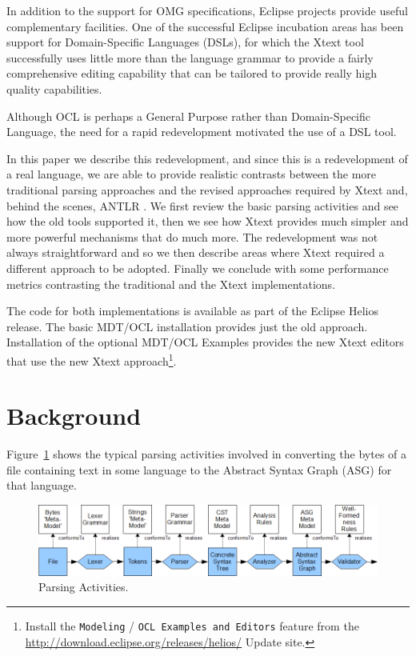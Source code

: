 \documentclass[runningheads,a4paper]{llncs}
\begin{document}
In addition to the support for OMG specifications, Eclipse projects provide useful complementary facilities. One of the successful Eclipse incubation areas has been support for Domain-Specific Languages (DSLs), for which the Xtext\cite{TMF/Xtext} tool successfully uses little more than the language grammar to provide a fairly comprehensive editing capability that can be tailored to provide really high quality capabilities.

Although OCL is perhaps a General Purpose rather than Domain-Specific Language, the need for a rapid redevelopment motivated the use of a DSL tool.

In this paper we describe this redevelopment, and since this is a redevelopment of a real language, we are able to provide realistic contrasts between the more traditional parsing approaches and the revised approaches required by Xtext and, behind the scenes, ANTLR \cite{ANTLR}. We first review the basic parsing activities and see how the old tools supported it, then we see how Xtext provides much simpler and more powerful mechanisms that do much more. The redevelopment was not always straightforward and so we then describe areas where Xtext required a different approach to be adopted. Finally we conclude with some performance metrics contrasting the traditional and the Xtext implementations.

The code for both implementations is available as part of the Eclipse Helios release. The basic MDT/OCL installation provides just the old approach. Installation of the optional MDT/OCL Examples provides the new Xtext editors that use the new Xtext approach\footnote{Install the {\tt Modeling} / {\tt OCL Examples and Editors} feature from the \url{http://download.eclipse.org/releases/helios/} Update site.}.

\section{Background}

Figure~\ref{fig:ParsingActivities} shows the typical parsing activities involved in converting the bytes of a file containing text in some language to the Abstract Syntax Graph (ASG)\cite{dragon} for that language.
	
\begin{figure}
  \begin{center}
    \includegraphics[width=4.75in]{ParsingPhases.png}
  \end{center}
  \caption{Parsing Activities.}
  \label{fig:ParsingActivities}
\end{figure}
\end{document}

